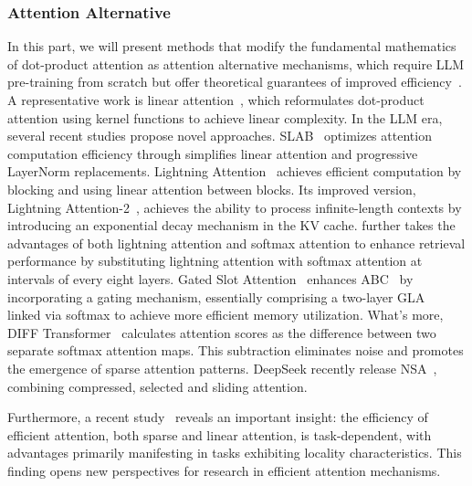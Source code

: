 \subsubsection{Attention Alternative}
In this part, we will present methods that modify the fundamental mathematics of dot-product attention as attention alternative mechanisms, which require LLM pre-training from scratch but offer theoretical guarantees of improved efficiency~\citep{choromanski2020rethinking}. A representative work is linear attention~\citep{katharopoulos2020transformers}, which reformulates dot-product attention using kernel functions to achieve linear complexity. 
In the LLM era, several recent studies propose novel approaches. SLAB~\citep{guo2024slab} optimizes attention computation efficiency through simplifies linear attention and progressive LayerNorm replacements. Lightning Attention~\citep{qin2024various} achieves efficient computation by blocking and using linear attention between blocks. Its improved version, Lightning Attention-2~\citep{qin2024lightning}, achieves the ability to process infinite-length contexts by introducing an exponential decay mechanism in the KV cache. \citet{minimax2025minimax01scalingfoundationmodels} further takes the advantages of both lightning attention and softmax attention to enhance retrieval performance by substituting lightning attention with softmax attention at intervals of every eight layers. Gated Slot Attention~\citep{zhanggated} enhances ABC~\citep{peng2022abc} by incorporating a gating mechanism, essentially comprising a two-layer GLA~\citep{yanggated} linked via softmax to achieve more efficient memory utilization. What's more, DIFF Transformer~\citep{ye2024differential} calculates attention scores as the difference between two separate softmax attention maps. This subtraction eliminates noise and promotes the emergence of sparse attention patterns. DeepSeek recently release NSA~\citep{yuan2025native}, combining compressed, selected and sliding attention. 

Furthermore, a recent study~\citep{yang2024efficient} reveals an important insight: the efficiency of efficient attention, both sparse and linear attention, is task-dependent, with advantages primarily manifesting in tasks exhibiting locality characteristics. This finding opens new perspectives for research in efficient attention mechanisms.

